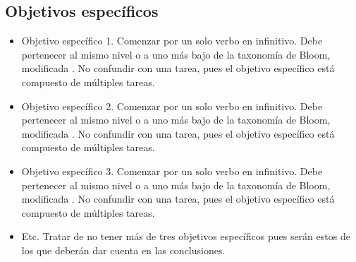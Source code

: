 \subsection{Objetivos específicos}
\begin{itemize}
    \item Objetivo específico 1. Comenzar por un solo verbo en infinitivo. Debe pertenecer al mismo nivel o a uno más bajo de la taxonomía de Bloom, modificada \textcite{anderson2001taxonomy}. No confundir con una tarea, pues el objetivo específico está compuesto de múltiples tareas.
    \item Objetivo específico 2. Comenzar por un solo verbo en infinitivo. Debe pertenecer al mismo nivel o a uno más bajo de la taxonomía de Bloom, modificada \textcite{anderson2001taxonomy}. No confundir con una tarea, pues el objetivo específico está compuesto de múltiples tareas.
    \item Objetivo específico 3. Comenzar por un solo verbo en infinitivo. Debe pertenecer al mismo nivel o a uno más bajo de la taxonomía de Bloom, modificada \textcite{anderson2001taxonomy}. No confundir con una tarea, pues el objetivo específico está compuesto de múltiples tareas.
    \item Etc. Tratar de no tener más de tres objetivos específicos pues serán estos de los que deberán dar cuenta en las conclusiones.
\end{itemize}